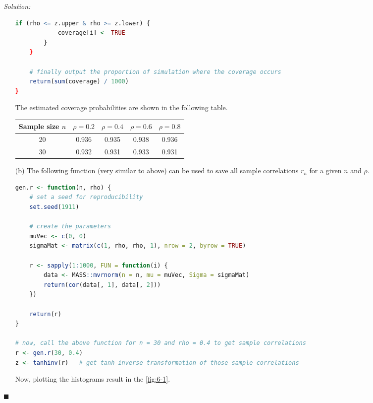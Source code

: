 \documentclass[12pt]{article}
\theoremstyle{definition}
\newenvironment{answer}{\textit{Solution: }\quad }{ \hfill $\blacksquare$}
\numberwithin{equation}{section}
\begin{document}
\begin{answer}
\begin{enumerate}
\begin{lstlisting}[language = R]
        if (rho <= z.upper & rho >= z.lower) {
            coverage[i] <- TRUE
        }
    }
    
    # finally output the proportion of simulation where the coverage occurs
    return(sum(coverage) / 1000)
}
\end{lstlisting}

    The estimated coverage probabilities are shown in the following table.

    \begin{table}[h]
        \centering
        \begin{tabular}{|c|c|c|c|c|}
            \hline
            \textbf{Sample size $n$} & $\rho = 0.2$ & $\rho = 0.4$ & $\rho = 0.6$ & $\rho = 0.8$\\
            \hline
            20 & 0.936 & 0.935 & 0.938 & 0.936\\
            30 & 0.932 & 0.931 & 0.933 & 0.931\\
            \hline
        \end{tabular}
    \end{table}



        \item[(b)]  The following function (very similar to above) can be used to save all sample correlations $r_n$ for a given $n$ and $\rho$.
         
\begin{lstlisting}[language = R]
gen.r <- function(n, rho) {
    # set a seed for reproducibility
    set.seed(1911)
    
    # create the parameters
    muVec <- c(0, 0)
    sigmaMat <- matrix(c(1, rho, rho, 1), nrow = 2, byrow = TRUE)
    
    r <- sapply(1:1000, FUN = function(i) {
        data <- MASS::mvrnorm(n = n, mu = muVec, Sigma = sigmaMat)
        return(cor(data[, 1], data[, 2]))
    })
    
    return(r)
}

# now, call the above function for n = 30 and rho = 0.4 to get sample correlations
r <- gen.r(30, 0.4)
z <- tanhinv(r)   # get tanh inverse transformation of those sample correlations
\end{lstlisting}
        
    Now, plotting the histograms result in the \cref{fig:6-1}.


\end{enumerate}
\end{answer}
\end{document}
